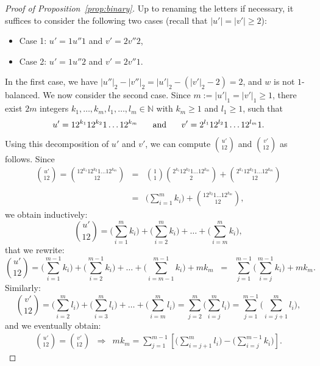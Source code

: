 \documentclass{template_arxiv}
\theoremstyle{definition}
\newcommand{\ds}{\displaystyle}
\newcommand{\N}{\mathbb{N}}
\begin{document}
\begin{proof}[Proof of Proposition~\ref{prop:binary}]
Up to renaming the letters if necessary, it suffices to consider the following two cases (recall that $|u'|=|v'|\geq 2$):

\begin{itemize}
    \vspace{-0.3cm}\item[-] Case 1: $u'=1u''1$ and $v'=2v''2$,
    \vspace{-0.3cm}\item[-] Case 2: $u'=1u''2$ and $v'=2v''1$.
\end{itemize}
\vspace{-0.3cm}
In the first case, we have $|u''|_2-|v''|_2=|u'|_2-(|v'|_2-2)=2$, and $w$ is not $1$-balanced. We now consider the second case. Since $m:=|u'|_1=|v'|_1\geq 1$, there exist $2m$ integers $k_1,\ldots,k_m,l_1,\ldots,l_m\in\N$ with $k_m\geq 1$ and $l_1\geq 1$, such that
\[
    u'=12^{k_1}12^{k_2}1\ldots 12^{k_m} \hspace{0.5cm}\text{ and }\hspace{0.5cm} v'=2^{l_1}12^{l_2}1\ldots 12^{l_m}1.
\]
Using this decomposition of $u'$ and $v'$, we can compute $\binom{u'}{12}$ and $\binom{v'}{12}$ as follows. Since
\[
    \begin{array}{rcl}
        \ds\binom{u'}{12} = \binom{1 2^{k_1} 1 2^{k_2} 1\ldots 1 2^{k_m}}{12} &=& \ds\binom{1}{1}\binom{2^{k_1} 1 2^{k_2} 1\ldots 1 2^{k_m}}{2}+\binom{2^{k_1} 1 2^{k_2} 1\ldots 1 2^{k_m}}{12}\\
        \\
        &=& \ds\Big(\sum\limits_{i=1}^m k_i\Big)+\binom{ 1 2^{k_2} 1\ldots 1 2^{k_m}}{12},
    \end{array}
\]
we obtain inductively:
\[
    \binom{u'}{12}=\Big(\sum\limits_{i=1}^{m}k_i\Big)+\Big(\sum\limits_{i=2}^{m}k_i\Big)+\ldots+\Big(\sum\limits_{i=m}^{m}k_i\Big),
\]
that we rewrite:
\[
    \binom{u'}{12}=\ds\Big(\sum\limits_{i=1}^{m-1}k_i\Big)+\Big(\sum\limits_{i=2}^{m-1}k_i\Big)+\ldots+\Big(\sum\limits_{i=m-1}^{m-1}k_i\Big)+mk_m \;\;=\;\; \sum\limits_{j=1}^{m-1}\Big(\sum\limits_{i=j}^{m-1} k_i\Big)+mk_m.
\]
Similarly:
\[
    \binom{v'}{12}=\Big(\sum\limits_{i=2}^{m}l_i\Big)+\Big(\sum\limits_{i=3}^{m}l_i\Big)+\ldots+\Big(\sum\limits_{i=m}^{m}l_i\Big) =\sum\limits_{j=2}^{m}\Big(\sum\limits_{i=j}^m l_i\Big)=\sum\limits_{j=1}^{m-1}\Big(\sum\limits_{i=j+1}^m l_i\Big),
\]
and we eventually obtain:
\[
    \begin{array}{rcl}
        \ds\binom{u'}{12}=\binom{v'}{12} &\Longrightarrow& \ds mk_m=\sum\limits_{j=1}^{m-1}\left[\Big(\sum\limits_{i=j+1}^m l_i\Big)-\Big(\sum\limits_{i=j}^{m-1} k_i\Big)\right].

\end{array}\]
\end{proof}
\end{document}
